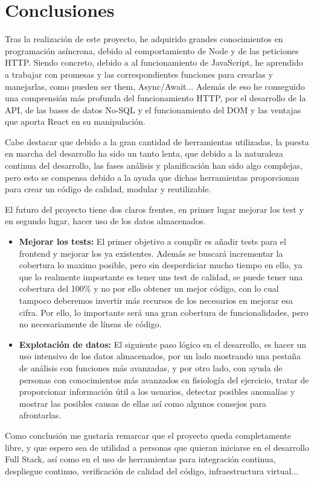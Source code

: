 \chapter{Conclusiones}

Tras la realización de este proyecto, he adquirido grandes conocimientos en programación asíncrona, debido al comportamiento de Node y de las peticiones HTTP. Siendo concreto, debido a al funcionamiento de JavaScript, he aprendido a trabajar con promesas y las correspondientes funciones para crearlas y manejarlas, como pueden ser them, Async/Await... Además de eso he conseguido una comprensión más profunda del funcionamiento HTTP, por el desarrollo de la API, de las bases de datos No-SQL y el funcionamiento del DOM y las ventajas que aporta React en su manipulación.

Cabe destacar que debido a la gran cantidad de herramientas utilizadas, la puesta en marcha del desarrollo ha sido un tanto lenta, que debido a la naturaleza continua del desarrollo, las fases análisis y planificación han sido algo complejas, pero esto se compensa debido a la ayuda que dichas herramientas proporcionan para crear un código de calidad, modular y reutilizable.

El futuro del proyecto tiene dos claros frentes, en primer lugar mejorar los test y en segundo lugar, hacer uso de los datos almacenados.
\begin{itemize}
  \item \textbf{Mejorar los tests: } El primer objetivo a complir es añadir tests para el frontend y mejorar los ya existentes. Además se buscará incrementar la cobertura lo maximo posible, pero sin desperdiciar mucho tiempo en ello, ya que lo realmente importante es tener uns test de calidad, se puede tener una cobertura del 100\% y no por ello obtener un mejor código, con lo cual tampoco deberemos invertir más recursos de los necesarios en mejorar esa cifra. Por ello, lo importante será una gran cobertura de funcionalidades, pero no necesariamente de líneas de código.
  \item \textbf{Explotación de datos: } El siguiente paso lógico en el desarrollo, es hacer un uso intensivo de los datos almacenados, por un lado mostrando una pestaña de análisis con funciones más avanzadas, y por otro lado, con ayuda de personas con conocimientos más avanzados en fisiología del ejercicio, tratar de proporcionar información útil a los usuarios, detectar posibles anomalías y mostrar las posibles causas de ellas así como algunos consejos para afrontarlas.
\end{itemize}

Como conclusión me gustaría remarcar que el proyecto queda completamente libre, y que espero sea de utilidad a personas que quieran iniciarse en el desarrollo Full Stack, así como en el uso de herramientas para integración continua, despliegue continuo, verificación de calidad del código, infraestructura virtual...



